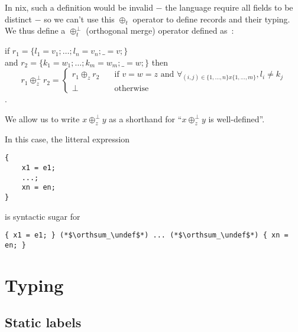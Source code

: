 \documentclass{article}
\newcommand{\undef}{\oslash}
\newcommand{\orthsum}{\oplus^\bot}
\newcommand{\Γ}{\Gamma}
\newcommand{\τ}{\tau}
\begin{document}
In nix, such a definition would be invalid − the language require all
fields to be distinct − so we can't use this $\oplus_t$ operator to
define records and their typing.
We thus define a $\orthsum_t$ (orthogonal merge) operator defined as~:

if $r_1 = \{ l_1 = v_1; \ldots{}; l_n = v_n; \_ = v; \}$ \\
and $r_2 = \{ k_1 = w_1; \ldots{}; k_m = w_m; \_ = w; \}$
then
\[
  r_1 \orthsum_z r_2 =
  \begin{cases}
    r_1 \oplus_z r_2
      & \quad \text{if } v = w = z \text{\ and }
      \forall_{(i,j) \in \{1, \ldots{}, n \} x \{1, \ldots{}, m \}},
        l_i \neq k_j \\
    \bot & \quad \text{otherwise}
  \end{cases}
\].

We allow us to write $x \orthsum_z y$ as a shorthand for ``$x \orthsum_z y$ is
well-defined''.

In this case, the litteral expression

\begin{lstlisting}
{
    x1 = e1;
    ...;
    xn = en;
}
\end{lstlisting}

is syntactic sugar for

\begin{lstlisting}
{ x1 = e1; } (*$\orthsum_\undef$*) ... (*$\orthsum_\undef$*) { xn = en; }
\end{lstlisting}

\section{Typing}
\subsection{Static labels}




\end{document}
